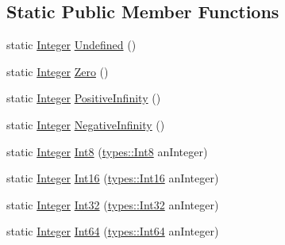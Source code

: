 \subsection*{Static Public Member Functions}
\begin{DoxyCompactItemize}
\item 
static \mbox{\hyperlink{classlibrary_1_1core_1_1types_1_1_integer}{Integer}} \mbox{\hyperlink{classlibrary_1_1core_1_1types_1_1_integer_a142c2df49031b787daf30673c73fcad7}{Undefined}} ()
\item 
static \mbox{\hyperlink{classlibrary_1_1core_1_1types_1_1_integer}{Integer}} \mbox{\hyperlink{classlibrary_1_1core_1_1types_1_1_integer_a908c9b717859421a99d6d8c269685211}{Zero}} ()
\item 
static \mbox{\hyperlink{classlibrary_1_1core_1_1types_1_1_integer}{Integer}} \mbox{\hyperlink{classlibrary_1_1core_1_1types_1_1_integer_a807320f164c841288eafff5f49470c00}{Positive\+Infinity}} ()
\item 
static \mbox{\hyperlink{classlibrary_1_1core_1_1types_1_1_integer}{Integer}} \mbox{\hyperlink{classlibrary_1_1core_1_1types_1_1_integer_aa8151c3b615012ec215d20da6de593bd}{Negative\+Infinity}} ()
\item 
static \mbox{\hyperlink{classlibrary_1_1core_1_1types_1_1_integer}{Integer}} \mbox{\hyperlink{classlibrary_1_1core_1_1types_1_1_integer_ae0a1da7739a3990f61ee8a56b3f4cd6a}{Int8}} (\mbox{\hyperlink{namespacelibrary_1_1core_1_1types_a31bb31acb8e07271b66571cf8e6eafee}{types\+::\+Int8}} an\+Integer)
\item 
static \mbox{\hyperlink{classlibrary_1_1core_1_1types_1_1_integer}{Integer}} \mbox{\hyperlink{classlibrary_1_1core_1_1types_1_1_integer_ae91520c03f3f2455580c98ffdc431a5f}{Int16}} (\mbox{\hyperlink{namespacelibrary_1_1core_1_1types_a150247fa2cd1b258b8e5950efcaecfc9}{types\+::\+Int16}} an\+Integer)
\item 
static \mbox{\hyperlink{classlibrary_1_1core_1_1types_1_1_integer}{Integer}} \mbox{\hyperlink{classlibrary_1_1core_1_1types_1_1_integer_a3adfbe3b3972643d486a2a8f781a5d9f}{Int32}} (\mbox{\hyperlink{namespacelibrary_1_1core_1_1types_acaf2598d96f2239dc55e54628da77876}{types\+::\+Int32}} an\+Integer)
\item 
static \mbox{\hyperlink{classlibrary_1_1core_1_1types_1_1_integer}{Integer}} \mbox{\hyperlink{classlibrary_1_1core_1_1types_1_1_integer_a24c417fe94624194efd4d3ffc301c0b3}{Int64}} (\mbox{\hyperlink{namespacelibrary_1_1core_1_1types_aaa5045e0d51ac9cff3c0aeff2b792c8c}{types\+::\+Int64}} an\+Integer)
\item 

\end{DoxyCompactItemize}
